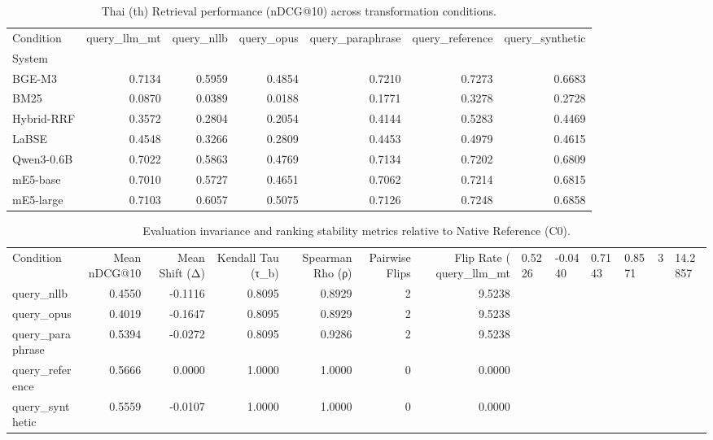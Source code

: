 \begin{table}
\caption{Thai (th) Retrieval performance (nDCG@10) across transformation conditions.}
\label{tab:retrieval_performance_th}
\begin{tabular}{lrrrrrr}
\toprule
Condition & query_llm_mt & query_nllb & query_opus & query_paraphrase & query_reference & query_synthetic \\
System &  &  &  &  &  &  \\
\midrule
BGE-M3 & 0.7134 & 0.5959 & 0.4854 & 0.7210 & 0.7273 & 0.6683 \\
BM25 & 0.0870 & 0.0389 & 0.0188 & 0.1771 & 0.3278 & 0.2728 \\
Hybrid-RRF & 0.3572 & 0.2804 & 0.2054 & 0.4144 & 0.5283 & 0.4469 \\
LaBSE & 0.4548 & 0.3266 & 0.2809 & 0.4453 & 0.4979 & 0.4615 \\
Qwen3-0.6B & 0.7022 & 0.5863 & 0.4769 & 0.7134 & 0.7202 & 0.6809 \\
mE5-base & 0.7010 & 0.5727 & 0.4651 & 0.7062 & 0.7214 & 0.6815 \\
mE5-large & 0.7103 & 0.6057 & 0.5075 & 0.7126 & 0.7248 & 0.6858 \\
\bottomrule
\end{tabular}
\end{table}


\begin{table}
\caption{Evaluation invariance and ranking stability metrics relative to Native Reference (C0).}
\label{tab:evaluation_invariance_overall}
\begin{tabular}{lrrrrrr}
\toprule
Condition & Mean nDCG@10 & Mean Shift (Δ) & Kendall Tau (τ_b) & Spearman Rho (ρ) & Pairwise Flips & Flip Rate (%
\midrule
query_llm_mt & 0.5226 & -0.0440 & 0.7143 & 0.8571 & 3 & 14.2857 \\
query_nllb & 0.4550 & -0.1116 & 0.8095 & 0.8929 & 2 & 9.5238 \\
query_opus & 0.4019 & -0.1647 & 0.8095 & 0.8929 & 2 & 9.5238 \\
query_paraphrase & 0.5394 & -0.0272 & 0.8095 & 0.9286 & 2 & 9.5238 \\
query_reference & 0.5666 & 0.0000 & 1.0000 & 1.0000 & 0 & 0.0000 \\
query_synthetic & 0.5559 & -0.0107 & 1.0000 & 1.0000 & 0 & 0.0000 \\
\bottomrule
\end{tabular}
\end{table}


